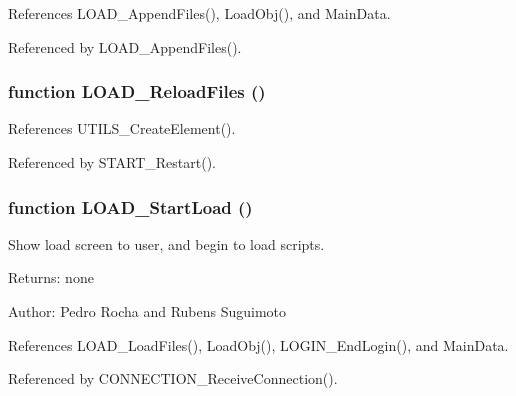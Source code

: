 References LOAD\_\-AppendFiles(), LoadObj(), and MainData.

Referenced by LOAD\_\-AppendFiles().
\subsubsection[LOAD\_\-ReloadFiles]{\setlength{\rightskip}{0pt plus 5cm}function LOAD\_\-ReloadFiles ()}\label{load_2load_8js_c662a76c18fd1916d40088f70ae051d1}




References UTILS\_\-CreateElement().

Referenced by START\_\-Restart().
\subsubsection[LOAD\_\-StartLoad]{\setlength{\rightskip}{0pt plus 5cm}function LOAD\_\-StartLoad ()}\label{load_2load_8js_3a1a0ec8e7f2cefa1e9c34f9609e6cf0}


Show load screen to user, and begin to load scripts. 

\begin{Desc}
\item[Returns:]none \end{Desc}
\begin{Desc}
\item[Author:]Pedro Rocha and Rubens Suguimoto \end{Desc}


References LOAD\_\-LoadFiles(), LoadObj(), LOGIN\_\-EndLogin(), and MainData.

Referenced by CONNECTION\_\-ReceiveConnection().